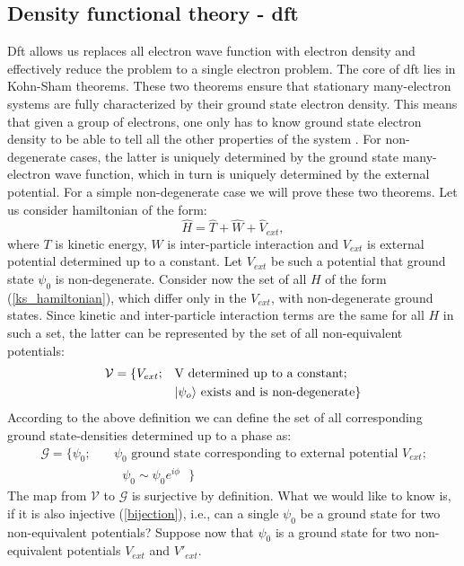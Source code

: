 \documentclass[openany, longbibliography,slovene,a4paper,12pt]{article}
\begin{document}
\subsection{Density functional theory - dft}
Dft allows us replaces all electron wave function with
electron density and effectively reduce the problem to a single electron problem.
The core of dft lies in Kohn-Sham theorems. These two theorems
ensure that stationary many-electron systems are fully characterized by their
ground state electron density. This means that given a group of electrons, one
only has to know ground state electron density to be able to tell all the other
properties of the system \cite{nobel_lecture}. For non-degenerate cases, the latter is uniquely
determined by the ground state many-electron wave function, which in turn is
uniquely determined by the external potential. For a simple non-degenerate case
we will prove these two theorems.
Let us consider hamiltonian of the form:
\begin{equation} \label{ks_hamiltonian}
\hat H = \hat T + \hat W + \hat V_{ext},
\end{equation}
where $T$ is kinetic energy, $W$ is inter-particle interaction and $V_{ext}$ is
external potential determined up to a constant. Let $V_{ext}$ be such a potential
that ground state $\psi_0$ is non-degenerate. Consider now the set of all $H$ of
the form (\ref{ks_hamiltonian}), which differ only in the $V_{ext}$, with
non-degenerate ground states. Since kinetic and inter-particle interaction terms
are the same for all $H$ in such a set, the latter can be represented by the set of all non-equivalent potentials:
\begin{equation}
  \begin{split}
    \mathcal{V} = \{V_{ext};\quad &\textrm{V determined up to a constant;}\\
    & \textrm{$\ket{\psi_o}$ exists and is non-degenerate}\}
    \end{split}
 \end{equation}
According to the above definition we can define the set of all corresponding
ground state-densities determined up to a phase as:
\begin{equation}
  \begin{split}
    \mathcal{G} = \{\psi_0; \quad &\textrm{$\psi_0$ ground state corresponding to external potential $V_{ext}$;}\\
&\textrm{ $\psi_0\sim\psi_0e^{i\phi}$   }
    \}
    \end{split}
  \end{equation}
The map from $\mathcal{V}$ to $\mathcal{G}$ is surjective by definition. What we
would like to know is, if it is also injective  (\ref{bijection}), i.e., can a
single $\psi_0$ be a ground state for two non-equivalent potentials? Suppose now
that $\psi_0$ is a ground state for two non-equivalent potentials $V_{ext}$ and $V'_{ext}$.
\end{document}

